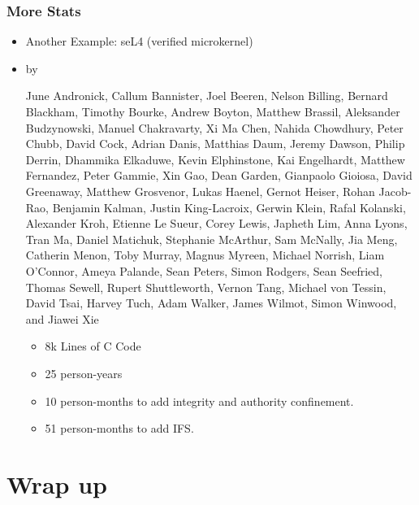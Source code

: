 \documentclass[aspectratio=169,t]{beamer}
\begin{document}
\begin{frame}
	\frametitle{More Stats}
	\vspace*{5ex}
	\begin{itemize}
		\item Another Example: seL4 (verified microkernel)
		\item<2-> by {\baselineskip-10pt\fontsize{3}{6} \selectfont June Andronick, Callum Bannister, Joel Beeren, Nelson Billing, Bernard Blackham, Timothy Bourke, Andrew Boyton, Matthew Brassil, Aleksander Budzynowski, Manuel Chakravarty, Xi Ma Chen, Nahida Chowdhury, Peter Chubb, David Cock, Adrian Danis, Matthias Daum, Jeremy Dawson, Philip Derrin, Dhammika Elkaduwe, Kevin Elphinstone, Kai Engelhardt, Matthew Fernandez, Peter Gammie, Xin Gao, Dean Garden, Gianpaolo Gioiosa, David Greenaway, Matthew Grosvenor, Lukas Haenel, Gernot Heiser, Rohan Jacob-Rao, Benjamin Kalman, Justin King-Lacroix, Gerwin Klein, Rafal Kolanski, Alexander Kroh, Etienne Le Sueur, Corey Lewis, Japheth Lim, Anna Lyons, Tran Ma, Daniel Matichuk, Stephanie McArthur, Sam McNally, Jia Meng, Catherin Menon, Toby Murray, Magnus Myreen, Michael Norrish, Liam O'Connor, Ameya Palande, Sean Peters, Simon Rodgers, Sean Seefried, Thomas Sewell, Rupert Shuttleworth, Vernon Tang, Michael von Tessin, David Tsai, Harvey Tuch, Adam Walker, James Wilmot, Simon Winwood, and Jiawei Xie\par}
		\begin{itemize}
			\item<3-> 8k Lines of C Code
			\item<4-> 25 person-years
			\item<5-> 10 person-months to add integrity and authority confinement.
			\item<5-> 51 person-months to add IFS.
		\end{itemize}
	\end{itemize}
\end{frame}


\section{Wrap up}
\end{document}
